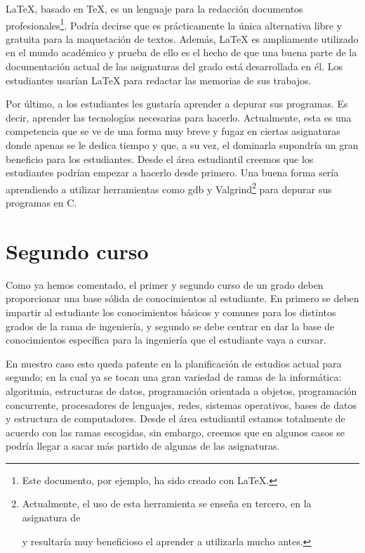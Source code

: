 \LaTeX, basado en \TeX, es un lenguaje para
la redacción documentos profesionales\footnote{
    Este documento, por ejemplo, ha sido creado con \LaTeX.
}.
Podría decirse que es prácticamente la única alternativa
libre y gratuita para la maquetación de textos.
Además, \LaTeX{} es ampliamente utilizado en el mundo académico y prueba de
ello es el hecho de que una buena parte de la documentación actual de las
 asignaturas del grado está desarrollada en él.
Los estudiantes usarían \LaTeX{} para redactar las memorias de sus trabajos.

Por último, a los estudiantes les gustaría aprender a depurar sus programas.
Es decir, aprender las tecnologías necesarias para hacerlo.
Actualmente, esta es una competencia que se ve de una forma muy breve y fugaz
en ciertas asignaturas donde apenas se le dedica tiempo y que, a su vez, el
dominarla supondría un gran beneficio para los estudiantes.
Desde el área estudiantil creemos que los estudiantes podrían empezar a
hacerlo desde primero.
Una buena forma sería
aprendiendo a utilizar herramientas como gdb y Valgrind\footnote{Actualmente,
 el uso de esta herramienta se enseña en tercero, en la asignatura de 
 \subject{Ampliación de Sistemas Operativos} y resultaría muy beneficioso el
 aprender a utilizarla mucho antes.} para depurar sus programas en C.

\section{Segundo curso}

Como ya hemos comentado, el primer y segundo curso de un grado deben proporcionar una base sólida
de conocimientos al estudiante. En primero se deben impartir al estudiante los conocimientos 
básicos y comunes para los distintos grados de la rama de ingeniería, y segundo se debe 
centrar en dar la base de conocimientos específica para la ingeniería que el estudiante vaya a cursar.

En nuestro caso esto queda patente en la planificación de estudios actual para segundo; en la cual 
ya se tocan una gran variedad de ramas de la informática: algoritmia, estructuras de datos, 
programación orientada a objetos, programación concurrente, procesadores de lenguajes, 
redes, sistemas operativos, bases de datos y estructura de computadores.
Desde el área estudiantil estamos totalmente de acuerdo con las ramas escogidas, sin embargo,
creemos que en algunos casos se podría llegar a sacar más partido de algunas de las 
asignaturas.

